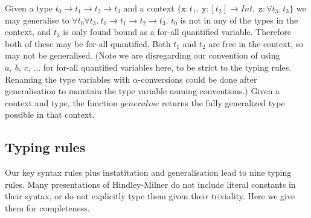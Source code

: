 \documentclass[a4paper,fleqn,oneside,12pt]{report}
\begin{document}
Given a type $t_0 \rightarrow t_1 \rightarrow t_2 \rightarrow t_3$ and a context $\{ \mathtt{x} : t_1,\ \mathtt{y} : [t_2] \rightarrow Int,\ \mathtt{z} : \forall t_3.\ t_3 \}$ we may generalise to $\forall t_0 \forall t_3.\ t_0 \rightarrow t_1 \rightarrow t_2 \rightarrow t_3$. $t_0$ is not in any of the types in the context, and $t_3$ is only found bound as a for-all quantified variable. Therefore both of these may be for-all quantified. Both $t_1$ and $t_2$ are free in the context, so may not be generalised. (Note we are disregarding our convention of using $a,\ b,\ c,\ \dots$ for for-all quantified variables here, to be strict to the typing rules. Renaming the type variables with $\alpha$-conversions could be done after generalisation to maintain the type variable naming conventions.) Given a context and type, the function $\mathit{generalise}$ returns the fully generalized type possible in that context.

\subsection{Typing rules}

Our key syntax rules plus instatitation and generalisation lead to nine typing rules. Many presentations of Hindley-Milner do not include literal constants in their syntax, or do not explicitly type them given their triviality. Here we give them for completeness.
\end{document}

